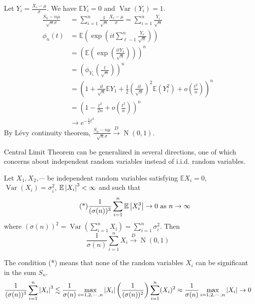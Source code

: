 \documentclass{huhtakm-template-book}
\newcommand{\expect}{\mathbb{E}}
\DeclareMathOperator{\N}{N}
\DeclareMathOperator{\Var}{Var}
\begin{document}
\begin{proofing}
	Let $Y_{i}=\frac{X_{i}-\mu}{\sigma}$. We have $\expect Y_{i}=0$ and $\Var(Y_{i})=1$.
	\begin{align*}
		\frac{S_{n}-n\mu}{\sqrt{n}\sigma}&=\sum_{i=1}^{n}\frac{1}{\sqrt{n}}\frac{X_{i}-\mu}{\sigma}=\sum_{i=1}^{n}\frac{Y_{i}}{\sqrt{n}}\\
		\phi_{n}(t)&=\expect\left(\exp\left(it\sum_{\ell-1}^{n}\frac{Y_{\ell}}{\sqrt{n}}\right)\right)\\
		&=\left(\expect\left(\exp\left(\frac{itY_{1}}{\sqrt{n}}\right)\right)\right)^{n}\\
		&=\left(\phi_{Y_{1}}\left(\frac{t}{\sqrt{n}}\right)\right)^{n}\\
		\tag{Taylor expansion}
		&=\left(1+\frac{it}{\sqrt{n}}\expect Y_{1}+\frac{1}{2}\left(\frac{it}{\sqrt{n}}\right)^{2}\expect(Y_{i}^{2})+o\left(\frac{t^{2}}{n}\right)\right)^{n}\\
		&=\left(1-\frac{t^{2}}{2n}+o\left(\frac{t^{2}}{n}\right)\right)^{n}\\
		&\to e^{-\frac{1}{2}t^{2}}
	\end{align*}
	By L\'evy continuity theorem, $\frac{S_{n}-n\mu}{\sqrt{n}\sigma}\xrightarrow{D}\N(0,1)$.
\end{proofing}
Central Limit Theorem can be generalized in several directions, one of which concerns about independent random variables instead of i.i.d. random variables.
\begin{thm}
	Let $X_{1},X_{2},\cdots$ be independent random variables satisfying $\expect X_{i}=0$, $\Var(X_{i})=\sigma_{i}^{2}$, $\expect\abs{X_{i}}^{3}<\infty$ and such that
	\begin{equation*}
		\tag{*}
		\frac{1}{(\sigma(n))^{3}}\sum_{i=1}^{n}\expect\abs{X_{i}^{3}}\to 0 \text{ as }n\to\infty
	\end{equation*}
	where $(\sigma(n))^{2}=\Var(\sum_{i=1}^{n}X_{i})=\sum_{i=1}^{n}\sigma_{i}^{2}$. Then
	\begin{equation*}
		\frac{1}{\sigma(n)}\sum_{i=1}^{n}X_{i}\xrightarrow{D}\N(0,1)
	\end{equation*}
\end{thm}
\begin{rem}
	The condition (*) means that none of the random variables $X_{i}$ can be significant in the sum $S_{n}$.
	\begin{equation*}
		\frac{1}{(\sigma(n))^{3}}\sum_{i=1}^{n}\left|{X_{i}}\right|^{3}\lesssim\frac{1}{\sigma(n)}\max_{i=1,2,\cdots,n}\left|{X_{i}}\right|\left(\frac{1}{(\sigma(n))^{2}}\right)\sum_{i=1}^{n}(X_{i})^{2}\approx\frac{1}{\sigma(n)}\max_{i=1,2,\cdots,n}\left|{X_{i}}\right|\to 0
	\end{equation*}
\end{rem}
\end{document}

